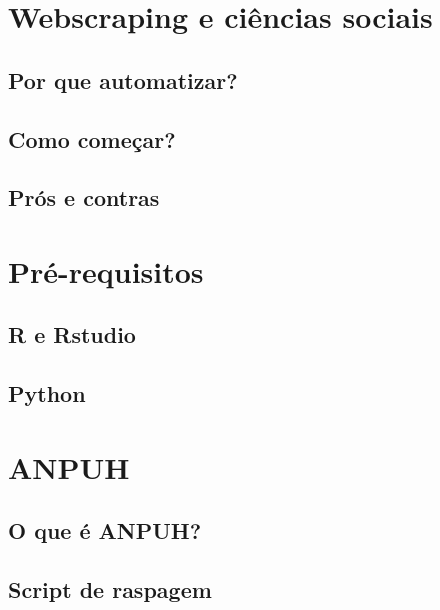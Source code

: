 \documentclass[
]{book}
\begin{document}
\hypertarget{webscraping-e-ciuxeancias-sociais}{%
\chapter{Webscraping e ciências sociais}\label{webscraping-e-ciuxeancias-sociais}}

\hypertarget{por-que-automatizar}{%
\section{Por que automatizar?}\label{por-que-automatizar}}

\hypertarget{como-comeuxe7ar}{%
\section{Como começar?}\label{como-comeuxe7ar}}

\hypertarget{pruxf3s-e-contras}{%
\section{Prós e contras}\label{pruxf3s-e-contras}}

\hypertarget{pruxe9-requisitos}{%
\chapter{Pré-requisitos}\label{pruxe9-requisitos}}

\hypertarget{r-e-rstudio}{%
\section{R e Rstudio}\label{r-e-rstudio}}

\hypertarget{python}{%
\section{Python}\label{python}}

\hypertarget{anpuh}{%
\chapter{ANPUH}\label{anpuh}}

\hypertarget{o-que-uxe9-anpuh}{%
\section{O que é ANPUH?}\label{o-que-uxe9-anpuh}}

\hypertarget{script-de-raspagem}{%
\section{Script de raspagem}\label{script-de-raspagem}}
\end{document}
